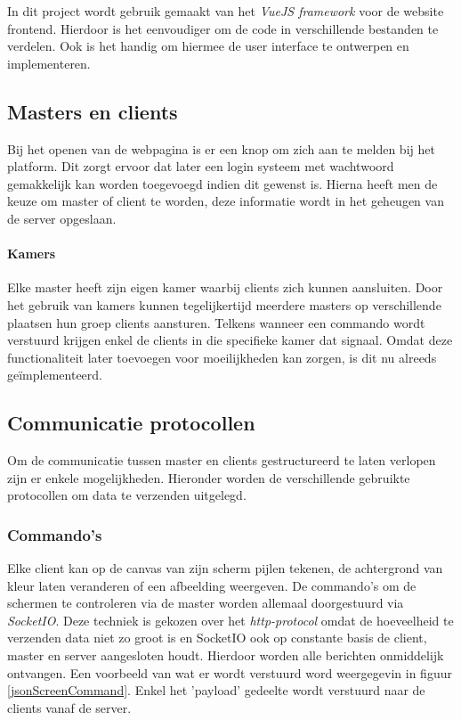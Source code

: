In dit project wordt gebruik gemaakt van het \textit{VueJS framework} voor de website frontend. Hierdoor is het eenvoudiger om de code in verschillende bestanden te verdelen. Ook is het handig om hiermee de user interface te ontwerpen en implementeren. 


\subsection{Masters en clients}
Bij het openen van de webpagina is er een knop om zich aan te melden bij het platform.
Dit zorgt ervoor dat later een login systeem met wachtwoord gemakkelijk kan worden toegevoegd indien dit gewenst is.
Hierna heeft men de keuze om master of client te worden, deze informatie wordt in het geheugen van de server opgeslaan. 

\paragraph{Kamers} Elke master heeft zijn eigen kamer waarbij clients zich kunnen aansluiten. Door het gebruik van kamers kunnen tegelijkertijd meerdere masters op verschillende plaatsen hun groep clients aansturen.  Telkens wanneer een commando wordt verstuurd krijgen enkel de clients in die specifieke kamer dat signaal. Omdat deze functionaliteit later toevoegen voor moeilijkheden kan zorgen, is dit nu alreeds geïmplementeerd.

\subsection{Communicatie protocollen}
Om de communicatie tussen master en clients gestructureerd te laten verlopen zijn er enkele mogelijkheden.
Hieronder worden de verschillende gebruikte protocollen om data te verzenden uitgelegd.
\subsubsection{Commando's}
Elke client kan op de canvas van zijn scherm pijlen tekenen, de achtergrond van kleur laten veranderen of een afbeelding weergeven. De commando's om de schermen te controleren via de master worden allemaal doorgestuurd via \textit{SocketIO}. Deze techniek is gekozen over het \textit{http-protocol} omdat de hoeveelheid te verzenden data niet zo groot is en SocketIO ook op constante basis de client, master en server aangesloten houdt. Hierdoor worden alle berichten onmiddelijk ontvangen. Een voorbeeld van wat er wordt verstuurd word weergegevin in figuur \ref{jsonScreenCommand}.
Enkel het 'payload' gedeelte wordt verstuurd naar de clients vanaf de server.

